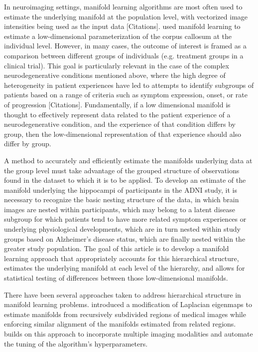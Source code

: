 \documentclass[11pt,reqno]{article}
\theoremstyle{definition}
\begin{document}
In neuroimaging settings, manifold learning algorithms are most often used to estimate the underlying manifold at the population level, with vectorized image intensities being used as the input data [Citations]. \cite{yueParameterizationWhiteMatter2016} used manifold learning to estimate a low-dimensional parameterization of the corpus callosum at the individual level. However, in many cases, the outcome of interest is framed as a comparison between different groups of individuals (e.g. treatment groups in a clinical trial). This goal is particularly relevant in the case of the complex neurodegenerative conditions mentioned above, where the high degree of heterogeneity in patient experiences have led to attempts to identify subgroups of patients based on a range of criteria such as symptom expression, onset, or rate of progression [Citations]. Fundamentally, if a low dimensional manifold is thought to effectively represent data related to the patient experience of a neurodegenerative condition, and the experience of that condition differs by group, then the low-dimensional representation of that experience should also differ by group.

A method to accurately and efficiently estimate the manifolds underlying data at the group level must take advantage of the grouped structure of observations found in the dataset to which it is to be applied. To develop an estimate of the manifold underlying the hippocampi of participants in the ADNI study, it is necessary to recognize the basic nesting structure of the data, in which brain images are nested within participants, which may belong to a latent disease subgroup for which patients tend to have more related symptom experiences or underlying physiological developments, which are in turn nested within study groups based on Alzheimer's disease status, which are finally nested within the greater study population. The goal of this article is to develop a manifold learning approach that appropriately accounts for this hierarchical structure, estimates the underlying manifold at each level of the hierarchy, and allows for statistical testing of differences between those low-dimensional manifolds.

There have been several approaches taken to address hierarchical structure in manifold learning problems. \cite{bhatiaHierarchicalManifoldLearning2012} introduced a modification of Laplacian eigenmaps to estimate manifolds from recursively subdivided regions of medical images while enforcing similar alignment of the manifolds estimated from related regions. \cite{freicheCharacterizingMyocardialIschemia2022} builds on this approach to incorporate multiple imaging modalities and automate the tuning of the algorithm's hyperparameters. 
\end{document}
